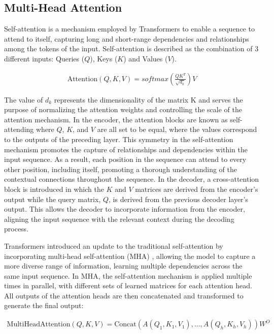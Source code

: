\subsection{Multi-Head Attention}

Self-attention is a mechanism employed by Transformers to enable a sequence to attend to itself, capturing long and short-range dependencies and relationships among the tokens of the input. Self-attention is described as the combination of 3 different inputs: Queries ($Q$), Keys ($K$) and Values ($V$).

\begin{equation}
    \begin{gathered}
        \text{Attention}(Q,K,V) = softmax \left( \frac{QK^T}{\sqrt{d_k} } \right) V
    \end{gathered}
    \label{eq:self_attention}
\end{equation}

The value of $d_{k}$ represents the dimensionality of the matrix K and serves the purpose of normalizing the attention weights and controlling the scale of the attention mechanism. In the encoder, the attention blocks are known as self-attending where $Q$, $K$, and $V$ are all set to be equal, where the values correspond to the outputs of the preceding layer. This symmetry in the self-attention mechanism promotes the capture of relationships and dependencies within the input sequence. As a result, each position in the sequence can attend to every other position, including itself, promoting a thorough understanding of the contextual connections throughout the sequence. In the decoder, a cross-attention block is introduced in which the $K$ and $V$ matrices are derived from the encoder's output while the query matrix, $Q$, is derived from the previous decoder layer's output. This allows the decoder to incorporate information from the encoder, aligning the input sequence with the relevant context during the decoding process.

Transformers introduced an update to the traditional self-attention by incorporating multi-head self-attention (MHA) \cite{mha_paper}, allowing the model to capture a more diverse range of information, learning multiple dependencies across the same input sequence. In MHA, the self-attention mechanism is applied multiple times in parallel, with different sets of learned matrices for each attention head. All outputs of the attention heads are then concatenated and transformed to generate the final output:

\begin{equation}
    \begin{gathered}
        \text{MultiHeadAttention}(Q,K,V) = \text{Concat}\left( A(Q_{1}, K_{1}, V_{1}), ...,  A(Q_{h}, K_{h}, V_{h})\right) W^{O}
    \end{gathered}
    \label{eq:mha}
\end{equation}

